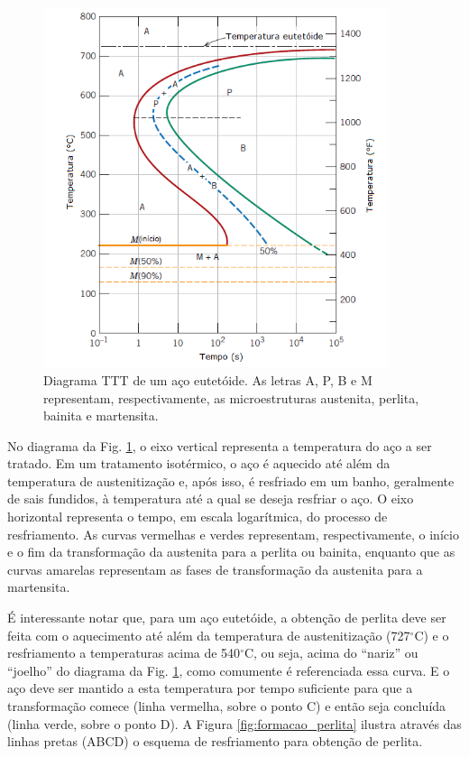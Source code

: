 \documentclass[
12pt,
openany, %
oneside, %
a4paper,			
english,			
brazil			        %
]{abntbibufjf}
\begin{document}
	\begin{figure}[H]
		\centering
		\includegraphics[width=0.9\textwidth]{isotermico}
		\caption{Diagrama TTT de um aço eutetóide. As letras A, P, B e M representam, respectivamente, as microestruturas austenita, perlita, bainita e martensita. \cite{callister2011materials}}
		\label{fig:isotermico}
	\end{figure}

	No diagrama da Fig. \ref{fig:isotermico}, o eixo vertical representa a temperatura do aço a ser tratado. Em um tratamento isotérmico, o aço é aquecido até além da temperatura de austenitização e, após isso, é resfriado em um banho, geralmente de sais fundidos, à temperatura até a qual se deseja resfriar o aço. O eixo horizontal representa o tempo, em escala logarítmica, do processo de resfriamento. As curvas vermelhas e verdes representam, respectivamente, o início e o fim da transformação da austenita para a perlita ou bainita, enquanto que as curvas amarelas representam as fases de transformação da austenita para a martensita.
	
	É interessante notar que, para um aço eutetóide, a obtenção de perlita deve ser feita com o aquecimento até além da temperatura de austenitização (727$^\circ$C) e o resfriamento a temperaturas acima de 540$^\circ$C, ou seja, acima do ``nariz'' ou ``joelho'' do diagrama da Fig. \ref{fig:isotermico}, como comumente é referenciada essa curva. E o aço deve ser mantido a esta temperatura por tempo suficiente para que a transformação comece (linha vermelha, sobre o ponto C) e então seja concluída (linha verde, sobre o ponto D). A Figura \ref{fig:formacao_perlita} ilustra através das linhas pretas (ABCD) o esquema de resfriamento para obtenção de perlita.
	
\end{document}
